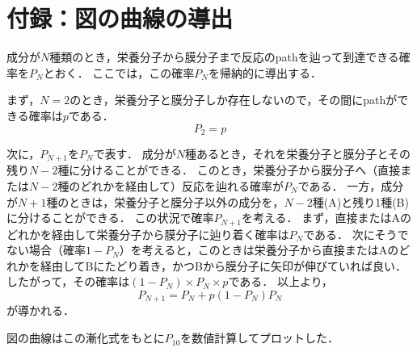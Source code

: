 \documentclass[a4paper,11pt]{jsarticle}
\begin{document}
\section{付録：図の曲線の導出}
成分が$N$種類のとき，栄養分子から膜分子まで反応のpathを辿って到達できる確率を$P_{N}$とおく．
ここでは，この確率$P_{N}$を帰納的に導出する．

まず，$N=2$のとき，栄養分子と膜分子しか存在しないので，その間にpathができる確率は$p$である．
\begin{equation}
  P_2 = p
\end{equation}

次に，$P_{N+1}$を$P_{N}$で表す．
成分が$N$種あるとき，それを栄養分子と膜分子とその残り$N-2$種に分けることができる．
このとき，栄養分子から膜分子へ（直接または$N-2$種のどれかを経由して）反応を辿れる確率が$P_N$である．
一方，成分が$N+1$種のときは，栄養分子と膜分子以外の成分を，$N-2$種(A)と残り1種(B)に分けることができる．
この状況で確率$P_{N+1}$を考える．
まず，直接またはAのどれかを経由して栄養分子から膜分子に辿り着く確率は$P_{N}$である．
次にそうでない場合（確率$1-P_{N}$）を考えると，このときは栄養分子から直接またはAのどれかを経由してBにたどり着き，かつBから膜分子に矢印が伸びていれば良い．
したがって，その確率は$(1-P_{N})\times P_{N}\times p$である．
以上より，
\begin{equation}
  P_{N+1} = P_{N} + p(1-P_{N})P_{N}
\end{equation}
が導かれる．

図の曲線はこの漸化式をもとに$P_{10}$を数値計算してプロットした．
\end{document}
